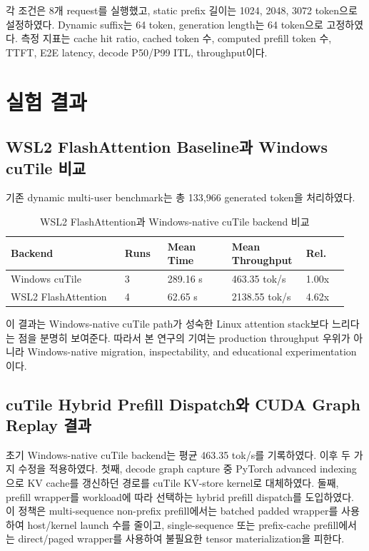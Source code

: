 \documentclass{kcc}
\begin{document}
각 조건은 8개 request를 실행했고, static prefix 길이는 1024, 2048, 3072 token으로 설정하였다. Dynamic suffix는 64 token, generation length는 64 token으로 고정하였다. 측정 지표는 cache hit ratio, cached token 수, computed prefill token 수, TTFT, E2E latency, decode P50/P99 ITL, throughput이다.

\section{실험 결과}
\subsection{WSL2 FlashAttention Baseline과 Windows cuTile 비교}
기존 dynamic multi-user benchmark는 총 133,966 generated token을 처리하였다.

\begin{table}[h]
\centering
\scriptsize
\setlength{\tabcolsep}{2pt}
\begin{tabular}{|p{0.32\linewidth}|p{0.12\linewidth}|p{0.18\linewidth}|p{0.20\linewidth}|p{0.12\linewidth}|}
\hline
\textbf{Backend} & \textbf{Runs} & \textbf{Mean Time} & \textbf{Mean Throughput} & \textbf{Rel.} \\ \hline
Windows cuTile & 3 & 289.16 s & 463.35 tok/s & 1.00x \\ \hline
WSL2 FlashAttention & 4 & 62.65 s & 2138.55 tok/s & 4.62x \\ \hline
\end{tabular}
\caption{WSL2 FlashAttention과 Windows-native cuTile backend 비교}
\end{table}

이 결과는 Windows-native cuTile path가 성숙한 Linux attention stack보다 느리다는 점을 분명히 보여준다. 따라서 본 연구의 기여는 production throughput 우위가 아니라 Windows-native migration, inspectability, and educational experimentation이다.


\subsection{cuTile Hybrid Prefill Dispatch와 CUDA Graph Replay 결과}
초기 Windows-native cuTile backend는 평균 463.35 tok/s를 기록하였다. 이후 두 가지 수정을 적용하였다. 첫째, decode graph capture 중 PyTorch advanced indexing으로 KV cache를 갱신하던 경로를 cuTile KV-store kernel로 대체하였다. 둘째, prefill wrapper를 workload에 따라 선택하는 hybrid prefill dispatch를 도입하였다. 이 정책은 multi-sequence non-prefix prefill에서는 batched padded wrapper를 사용하여 host/kernel launch 수를 줄이고, single-sequence 또는 prefix-cache prefill에서는 direct/paged wrapper를 사용하여 불필요한 tensor materialization을 피한다.
\end{document}
